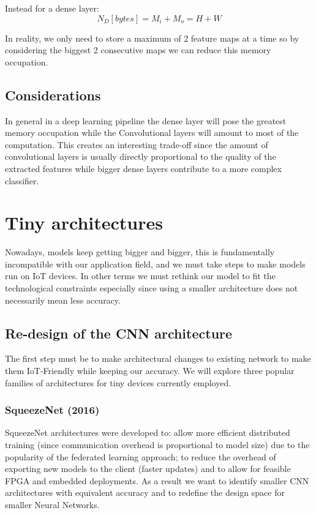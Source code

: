 \documentclass{article}
\begin{document}
      Instead for a dense layer:
      \begin{equation}
        N_D [bytes] = M_i + M_o  = H + W
      \end{equation}

      In reality, we only need to store a maximum of 2 feature maps at a time so by considering the biggest 2 consecutive maps we can reduce this memory occupation.
    \subsection{Considerations}
      In general in a deep learning pipeline the dense layer will pose the greatest memory occupation while the Convolutional layers will amount to most of the computation. This creates an interesting
      trade-off since the amount of convolutional layers is usually directly proportional to the quality of the extracted features while bigger dense layers contribute to a more complex classifier.

  \section{Tiny architectures}
    Nowadays, models keep getting bigger and bigger, this is fundamentally incompatible with our application field, and we must take steps to make models run on IoT devices. In other terms we must rethink our model
    to fit the technological constraints especially since using a smaller architecture does not necessarily mean less accuracy.

    \subsection{Re-design of the CNN architecture}
      The first step must be to make architectural changes to existing network to make them IoT-Friendly while keeping our accuracy. We will explore three popular families of architectures for tiny devices currently employed.
      \subsubsection{SqueezeNet (2016)}
        SqueezeNet architectures were developed to: allow more efficient distributed training (since communication overhead is proportional to model size) due to the popularity of the federated learning approach; to reduce the overhead of exporting new models to the client (faster updates) and to allow
        for feasible FPGA and embedded deployments. As a result we want to identify smaller CNN architectures with equivalent accuracy and to redefine the design space for smaller Neural Networks.
\end{document}
